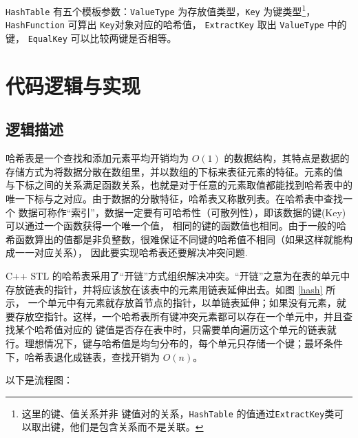 {\lstinline{HashTable} 有五个模板参数：\lstinline{ValueType} 为存放值类型，\lstinline{Key} 为键类型\footnote{这里的键、值关系并非%
键值对的关系，\lstinline{HashTable} 的值通过\lstinline{ExtractKey}类可以取出键，他们是包含关系而不是关联。}，%
\lstinline{HashFunction} 可算出 \lstinline{Key}对象对应的哈希值， \lstinline{ExtractKey} 取出 \lstinline{ValueType} 中的键，%
\lstinline{EqualKey} 可以比较两键是否相等。

\section{代码逻辑与实现}

\subsection{逻辑描述}

哈希表是一个查找和添加元素平均开销均为 $O(1)$ 的数据结构，其特点是数据的存储方式为将数据分散在数组里，并以数组的下标来表征元素的特征。元素的值%
与下标之间的关系满足函数关系，也就是对于任意的元素取值都能找到哈希表中的唯一下标与之对应。由于数据的分散特征，哈希表又称{散列表}。在哈希表中查找一个%
数据可称作“索引”，数据一定要有{\kaishu 可哈希性（可散列性）}，即该数据的{\kaishu 键(Key)}可以通过一个函数获得一个唯一个值，%
相同的键的函数值也相同。由于一般的哈希函数算出的值都是非负整数，很难保证不同键的哈希值不相同（如果这样就能构成一一对应关系），%
因此要实现哈希表还要解决{\kaishu 冲突}问题.

C++ STL 的哈希表采用了“开链”方式组织解决冲突。“开链”之意为在表的单元中存放链表的指针，并将应该放在该表中的元素用链表延伸出去。如图 \ref{hash} 所示，%
一个单元中有元素就存放首节点的指针，以单链表延伸；如果没有元素，就要存放空指针。这样，一个哈希表所有键冲突元素都可以存在一个单元中，并且查找某个哈希值对应的%
键值是否存在表中时，只需要单向遍历这个单元的链表就行。理想情况下，键与哈希值是均匀分布的，每个单元只存储一个键；最坏条件下，哈希表退化成链表，查找开销为 $O(n)$。

以下是流程图：

\newpage

{
    \begin{figure}[H]
        \centering
\end{figure}}}
